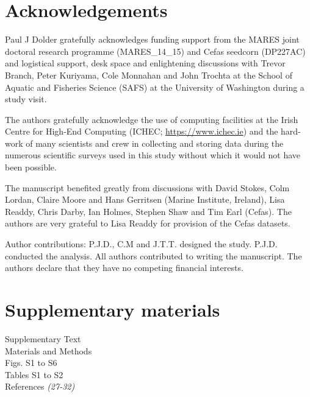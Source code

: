 \documentclass[12pt]{article}
\begin{document}




\newpage

\section*{Acknowledgements}

Paul J Dolder gratefully acknowledges funding support from the MARES joint
doctoral research programme (MARES\_14\_15) and Cefas seedcorn (DP227AC) and
logistical support, desk space and enlightening discussions with Trevor Branch,
Peter Kuriyama, Cole Monnahan and John Trochta at the School of Aquatic and
Fisheries Science (SAFS) at the University of Washington during a study visit.

The authors gratefully acknowledge the use of computing facilities at the Irish
Centre for High-End Computing (ICHEC; \url{https://www.ichec.ie}) and the
hard-work of many scientists and crew in collecting and storing data during the
numerous scientific surveys used in this study without which it would not have
been possible.  
	 
The manuscript benefited greatly from discussions with David Stokes, Colm
Lordan, Claire Moore and Hans Gerritsen (Marine Institute, Ireland), Lisa
Readdy, Chris Darby, Ian Holmes, Stephen Shaw and Tim Earl (Cefas).  The
authors are very grateful to Lisa Readdy for provision of the Cefas datasets.

Author contributions: P.J.D., C.M and J.T.T. designed the study. P.J.D.
conducted the analysis. All authors contributed to writing the manuscript. The
authors declare that they have no competing financial interests.


\section*{Supplementary materials}
Supplementary Text \\
Materials and Methods\\
Figs. S1 to S6\\
Tables S1 to S2\\
References \textit{(27-32)}


\end{document}

